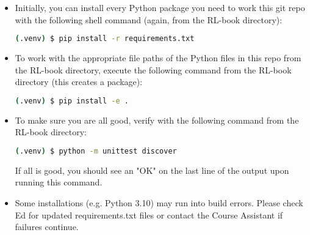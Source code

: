 \documentclass[12pt]{exam}
\begin{document}
\begin{questions}
\begin{itemize}
\begin{lstlisting}[language=bash]
(.venv) $ pip install matplotlib
\end{lstlisting}
\item Initially, you can install every Python package you need to work this git repo with the following shell command (again, from the RL-book directory):
\begin{lstlisting}[language=bash]
(.venv) $ pip install -r requirements.txt
\end{lstlisting}
\item To work with the appropriate file paths of the Python files in this repo from the RL-book directory, execute the following command from the RL-book directory (this creates a package):
\begin{lstlisting}[language=bash]
(.venv) $ pip install -e .
\end{lstlisting}
\item To make sure you are all good, verify with the following command from the RL-book directory:
\begin{lstlisting}[language=bash]
(.venv) $ python -m unittest discover
\end{lstlisting}
If all is good, you should see an "OK" on the last line of the output upon running this command.
\item Some installations (e.g. Python 3.10) may run into build errors. Please check Ed for updated requirements.txt files or contact the Course Assistant if failures continue.
\end{itemize}
\end{questions}
\end{document}
